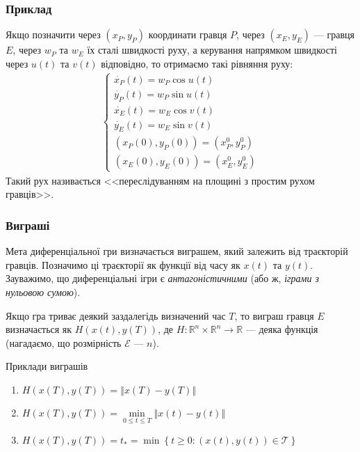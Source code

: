 \documentclass[10pt,pdf]{beamer}
\newcommand{\R}{\mathbb{R}}
\renewcommand{\d}[1]{\dot{#1}}
\newcommand{\E}{\mathcal{E}}
\newcommand{\T}{\mathcal{T}}
\renewcommand{\l}{\left}
\renewcommand{\r}{\right}
\newcommand{\norm}[1]{\left\Vert #1 \right\Vert}
\begin{document}
    \begin{frame}
        \frametitle{Приклад}
    
        Якщо позначити через $(x_P, y_P)$ координати гравця $P$, через $(x_E, y_E)$ --- гравця $E$, через $w_P$ та $w_E$ їх сталі швидкості руху, 
        а керування напрямком швидкості через $u(t)$ та $v(t)$ відповідно, то отримаємо такі рівняння руху:
        \begin{gather*}
            \begin{cases}
                \d{x_P}(t) = w_P \cos u(t) \\
                \d{y_P}(t) = w_P \sin u(t) \\
                \d{x_E}(t) = w_E \cos v(t) \\
                \d{y_E}(t) = w_E \sin v(t) \\
                (x_P(0), y_P(0)) = (x_P^0, y_P^0) \\
                (x_E(0), y_E(0)) = (x_E^0, y_E^0)
            \end{cases}
        \end{gather*}
        Такий рух називається <<переслідуванням на площині з простим рухом гравців>>.
    \end{frame}
    \begin{frame}
        \frametitle{Виграші}
    
        Мета диференціальної гри визначається виграшем, який залежить від траєкторій гравців. 
        Позначимо ці траєкторії як функції від часу як $x(t)$ та $y(t)$. 
        Зауважимо, що диференціальні ігри є \emph{антагоністичними} (або ж, \emph{іграми з нульовою сумою}).

        Якщо гра триває деякий заздалегідь визначений час $T$, то виграш гравця $E$ визначається
        як $H(x(t), y(T))$, де $H : \R^n \times \R^n \to \R$ --- деяка функція (нагадаємо, що розмірність $\E$ --- $n$).

        \begin{block}{Приклади виграшів}
            \begin{enumerate}
                \item $H(x(T), y(T)) = \norm{x(T) - y(T)}$
                \item $H(x(T), y(T)) = \underset{0 \leq t \leq T}{\min} \norm{x(t) - y(t)}$
                \item $H(x(T), y(T)) = t_* = \min \l\{ t \geq 0 : (x(t), y(t)) \in \T\r\}$
            \end{enumerate}
        \end{block}
    \end{frame}
\end{document}

